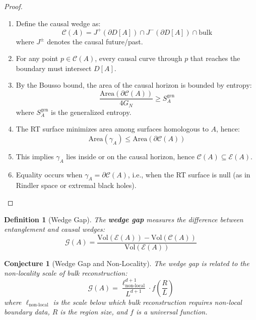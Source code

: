 \documentclass[12pt,a4paper]{article}
\newtheorem{conjecture}[theorem]{Conjecture}
\newtheorem{definition}[theorem]{Definition}
\begin{document}
\begin{proof}
\begin{enumerate}
    \item Define the causal wedge as:
    \begin{equation}
    \mathcal{C}(A) = J^+(\partial D[A]) \cap J^-(\partial D[A]) \cap \text{bulk}
    \end{equation}
    where $J^\pm$ denotes the causal future/past.
    
    \item For any point $p \in \mathcal{C}(A)$, every causal curve through $p$ that reaches the boundary must intersect $D[A]$.
    
    \item By the Bousso bound, the area of the causal horizon is bounded by entropy:
    \begin{equation}
    \frac{\text{Area}(\partial \mathcal{C}(A))}{4G_N} \geq S_A^{\text{gen}}
    \end{equation}
    where $S_A^{\text{gen}}$ is the generalized entropy.
    
    \item The RT surface minimizes area among surfaces homologous to $A$, hence:
    \begin{equation}
    \text{Area}(\gamma_A) \leq \text{Area}(\partial \mathcal{C}(A))
    \end{equation}
    
    \item This implies $\gamma_A$ lies inside or on the causal horizon, hence $\mathcal{C}(A) \subseteq \mathcal{E}(A)$.
    
    \item Equality occurs when $\gamma_A = \partial \mathcal{C}(A)$, i.e., when the RT surface is null (as in Rindler space or extremal black holes).
\end{enumerate}
\end{proof}

\begin{definition}[Wedge Gap]
The \textbf{wedge gap} measures the difference between entanglement and causal wedges:
\begin{equation}
\mathcal{G}(A) = \frac{\text{Vol}(\mathcal{E}(A)) - \text{Vol}(\mathcal{C}(A))}{\text{Vol}(\mathcal{E}(A))}
\end{equation}
\end{definition}

\begin{conjecture}[Wedge Gap and Non-Locality]
The wedge gap is related to the non-locality scale of bulk reconstruction:
\begin{equation}
\mathcal{G}(A) = \frac{\ell_{\text{non-local}}^{d+1}}{L^{d+1}} \cdot f\left(\frac{R}{L}\right)
\end{equation}
where $\ell_{\text{non-local}}$ is the scale below which bulk reconstruction requires non-local boundary data, $R$ is the region size, and $f$ is a universal function.
\end{conjecture}
\end{document}
